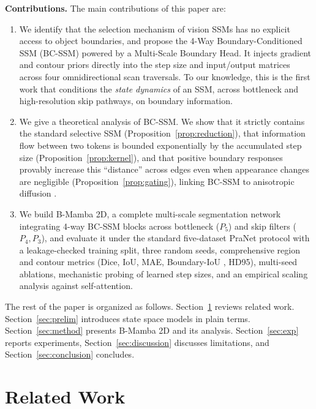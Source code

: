 \documentclass[journal]{IEEEtran}
\begin{document}
\textbf{Contributions.} The main contributions of this paper are:
\begin{enumerate}
  \item We identify that the selection mechanism of vision SSMs has no explicit access to object boundaries, and propose the 4-Way Boundary-Conditioned SSM (BC-SSM) powered by a Multi-Scale Boundary Head. It injects gradient and contour priors directly into the step size and input/output matrices across four omnidirectional scan traversals. To our knowledge, this is the first work that conditions the \emph{state dynamics} of an SSM, across bottleneck and high-resolution skip pathways, on boundary information.
  \item We give a theoretical analysis of BC-SSM. We show that it strictly contains the standard selective SSM (Proposition~\ref{prop:reduction}), that information flow between two tokens is bounded exponentially by the accumulated step size (Proposition~\ref{prop:kernel}), and that positive boundary responses provably increase this ``distance'' across edges even when appearance changes are negligible (Proposition~\ref{prop:gating}), linking BC-SSM to anisotropic diffusion \cite{perona1990anisotropic}.
  \item We build B-Mamba 2D, a complete multi-scale segmentation network integrating 4-way BC-SSM blocks across bottleneck ($P_5$) and skip filters ($P_4, P_3$), and evaluate it under the standard five-dataset PraNet protocol \cite{fan2020pranet} with a leakage-checked training split, three random seeds, comprehensive region and contour metrics (Dice, IoU, MAE, Boundary-IoU \cite{cheng2021boundaryiou}, HD95), multi-seed ablations, mechanistic probing of learned step sizes, and an empirical scaling analysis against self-attention.
\end{enumerate}

The rest of the paper is organized as follows. Section~\ref{sec:related} reviews related work. Section~\ref{sec:prelim} introduces state space models in plain terms. Section~\ref{sec:method} presents B-Mamba 2D and its analysis. Section~\ref{sec:exp} reports experiments, Section~\ref{sec:discussion} discusses limitations, and Section~\ref{sec:conclusion} concludes.

\section{Related Work}
\label{sec:related}
\end{document}
